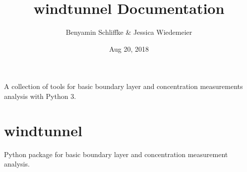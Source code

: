 \documentclass[letterpaper,10pt,english]{sphinxmanual}
\title{windtunnel Documentation}
\date{Aug 20, 2018}
\author{Benyamin Schliffke \& Jessica Wiedemeier}
\begin{document}
\maketitle
\sphinxtableofcontents
{}\label{\detokenize{index::doc}}


A collection of tools for basic boundary layer and concentration measurements analysis with Python 3.


\chapter{windtunnel}
\label{\detokenize{index:module-windtunnel}}\label{\detokenize{index:welcome-to-windtunnel-s-documentation}}\label{\detokenize{index:windtunnel}}
Python package for basic boundary layer and concentration measurement analysis.
\end{document}
